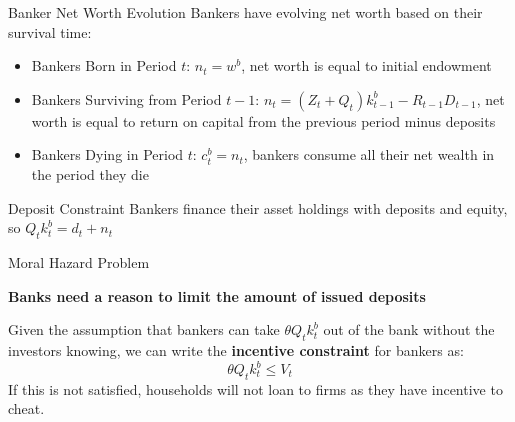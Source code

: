 \documentclass[
	11pt, %
	aspectratio=169, %
]{beamer}
\begin{document}
\begin{frame}{Banker Net Worth Evolution}
    Bankers have evolving net worth based on their survival time:
    \begin{itemize}
        \item Bankers Born in Period $t$: $n_t=w^b$, net worth is equal to initial endowment
        \item Bankers Surviving from Period $t-1$: $n_t=(Z_t+Q_t)k^b_{t-1}-R_{t-1}D_{t-1}$, net worth is equal to return on capital from the previous period minus deposits
        \item Bankers Dying in Period $t$: $c_t^b=n_t$, bankers consume all their net wealth in the period they die
    \end{itemize}
    \begin{block}{Deposit Constraint}
        Bankers finance their asset holdings with deposits and equity, so $Q_tk_t^b=d_t+n_t$
    \end{block}
\end{frame}
\begin{frame}{Moral Hazard Problem}
    \begin{center}
        \textbf{Banks need a reason to limit the amount of issued deposits}
    \end{center}
    \bigbreak
    \begin{definition}
        Given the assumption that bankers can take $\theta Q_tk_t^b$ out of the bank without the investors knowing, we can
        write the \textbf{incentive constraint} for bankers as:
        \begin{equation}
            \theta Q_tk_t^b\leq V_t
        \end{equation}
        If this is not satisfied, households will not loan to firms as they have incentive to cheat.
    \end{definition}
\end{frame}
\end{document}
